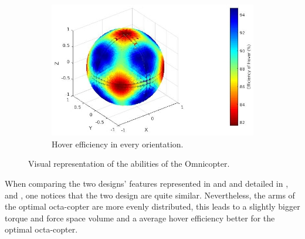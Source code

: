 {\begin{figure}[!ht]
{  \begin{subfigure}[b]{0.45\textwidth}
    \includegraphics[width=\linewidth]{images/Omnicopter_hspace.jpg}
    \caption{Hover efficiency in every orientation.} \label{fig:Omnicopter_hspace}
  \end{subfigure}}
  \caption{Visual representation of the abilities of the Omnicopter.}
  \label{fig:Omnicopter_spaces}
\end{figure}

When comparing the two designs’ features represented in 
and  and detailed in ,
 and , one
notices that the two design are quite similar. Nevertheless, the arms of the optimal octa-copter
are more evenly distributed, this leads to a slightly bigger torque and force space volume
and a average hover efficiency better for the optimal octa-copter.

\begin{table}[!ht]
\begin{center}
 \caption{Information on the designs’ force space properties.}\vspace{1ex}
 \label{tab:tab_Octa_compare_force}
\end{center}
\end{table}

}
